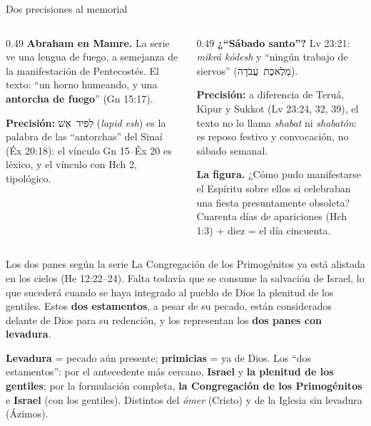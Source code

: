 \documentclass[hyperref={bookmarks=false},aspectratio=169]{beamer}
\newcommand{\heb}[1]{\mbox{\foreignlanguage{hebrew}{#1}}}
\newcommand{\destacar}[1]{\textbf{\textcolor{tierraroja}{#1}}}
\newcommand{\precision}[1]{{\footnotesize\color{sepia}\textbf{Precisión:} #1}}
\begin{document}
\begin{frame}{Dos precisiones al memorial}
\begin{columns}[t,onlytextwidth]
\begin{column}{0.49\textwidth}\small\RaggedRight
\textbf{Abraham en Mamre.} La serie ve una lengua de fuego, a semejanza de la manifestación de Pentecostés. El texto: ``un horno humeando, y una \destacar{antorcha de fuego}'' (Gn 15:17).\par\smallskip
\precision{\heb{לַפִּיד אֵשׁ} (\emph{lapid esh}) es la palabra de las ``antorchas'' del Sinaí (Éx 20:18): el vínculo Gn 15--Éx 20 es léxico, y el vínculo con Hch 2, tipológico.}
\end{column}
\begin{column}{0.49\textwidth}\small\RaggedRight
\textbf{¿``Sábado santo''?} Lv 23:21: \emph{mikrá kódesh} y ``ningún trabajo de siervos'' (\heb{מְלֶאכֶת עֲבֹדָה}).\par\smallskip
\precision{a diferencia de Teruá, Kipur y Sukkot (Lv 23:24, 32, 39), el texto no lo llama \emph{shabat} ni \emph{shabatón}: es reposo festivo y convocación, no sábado semanal.}\par\medskip
\textbf{La figura.} ¿Cómo pudo manifestarse el Espíritu sobre ellos si celebraban una fiesta presuntamente obsoleta? Cuarenta días de apariciones (Hch 1:3) + diez = el día cincuenta.
\end{column}
\end{columns}
\end{frame}

\begin{frame}{Los dos panes según la serie}
\small\RaggedRight La Congregación de los Primogénitos ya está alistada en los cielos (He 12:22--24). Falta todavía que se consume la salvación de Israel, lo que sucederá cuando se haya integrado al pueblo de Dios la plenitud de los gentiles. Estos \destacar{dos estamentos}, a pesar de su pecado, están considerados delante de Dios para su redención, y los representan los \destacar{dos panes con levadura}.\par\medskip
\small\RaggedRight \destacar{Levadura} = pecado aún presente; \destacar{primicias} = ya de Dios. Los ``dos estamentos'': por el antecedente más cercano, \textbf{Israel} y \textbf{la plenitud de los gentiles}; por la formulación completa, \textbf{la Congregación de los Primogénitos} e \textbf{Israel} (con los gentiles). Distintos del \emph{ómer} (Cristo) y de la Iglesia sin levadura (Ázimos).
\end{frame}
\end{document}
